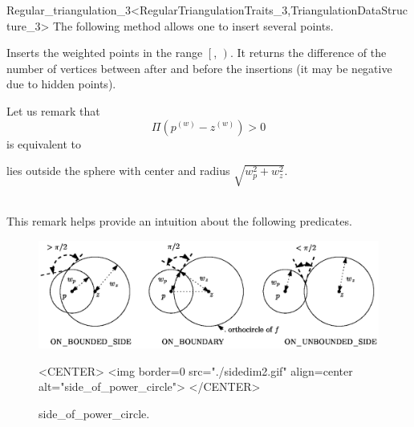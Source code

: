 \begin{ccRefClass}{Regular_triangulation_3<RegularTriangulationTraits_3,TriangulationDataStructure_3>}
The following method allows one to insert several points.

{Inserts the weighted points in the range $\left[\right.$,
$\left.\right)$. 
It returns the difference of the number of vertices between after and
before the insertions (it may be negative due to hidden points).
}


Let us remark that 
\[\Pi({p}^{(w)}-{z}^{(w)}) > 0\]
is equivalent to\\
\centerline{ lies outside the sphere with center  and radius
$\sqrt{w_p^2+w_z^2}$.}\\
This remark helps provide an intuition about the following predicates.

\begin{figure}[htbp]
\begin{ccTexOnly}
\begin{center} 
\includegraphics{sidedim2.eps} 
\end{center}
\end{ccTexOnly}
\caption{side\_of\_power\_circle.
\label{Triangulation3-fig-sidedim2}}
\begin{ccHtmlOnly}
<CENTER>
<img border=0 src="./sidedim2.gif" align=center
alt="side_of_power_circle"> 
</CENTER>
\end{ccHtmlOnly}
\end{figure} 


\end{ccRefClass}
